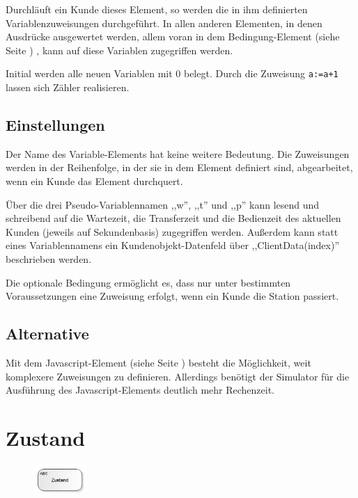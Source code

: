 Durchläuft ein Kunde dieses Element, so werden die in ihm definierten Variablenzuweisungen durchgeführt.
In allen anderen Elementen, in denen Ausdrücke ausgewertet werden, allem voran in dem
Bedingung-Element (siehe Seite \pageref{ref:ModelElementHold}) , kann auf diese Variablen zugegriffen werden.

Initial werden alle neuen Variablen mit 0 belegt. Durch die Zuweisung \texttt{a:=a+1} lassen sich
Zähler realisieren.

\subsection*{Einstellungen}

Der Name des Variable-Elements hat keine weitere Bedeutung. Die Zuweisungen werden in der Reihenfolge, in der
sie in dem Element definiert sind, abgearbeitet, wenn ein Kunde das Element durchquert.

Über die drei Pseudo-Variablennamen ,,w'', ,,t'' und ,,p'' kann lesend und schreibend auf die Wartezeit, die Transferzeit
und die Bedienzeit des aktuellen Kunden (jeweils auf Sekundenbasis) zugegriffen werden. Außerdem kann statt eines
Variablennamens ein Kundenobjekt-Datenfeld über ,,ClientData(index)'' beschrieben werden.

Die optionale Bedingung ermöglicht es, dass nur unter bestimmten Voraussetzungen eine Zuweisung erfolgt,
wenn ein Kunde die Station passiert.

\subsection*{Alternative}

Mit dem Javascript-Element (siehe Seite \pageref{ref:ModelElementSetJS}) besteht die Möglichkeit, weit komplexere
Zuweisungen zu definieren. Allerdings benötigt der Simulator für die Ausführung
des Javascript-Elements deutlich mehr Rechenzeit.


\section{Zustand}
\label{ref:ModelElementStateStatistics}

\begin{figure}
\vspace{-22pt}
\includegraphics[width=2cm]{imageModelElementStateStatistics.png}
\vspace{-22pt}
\end{figure}

